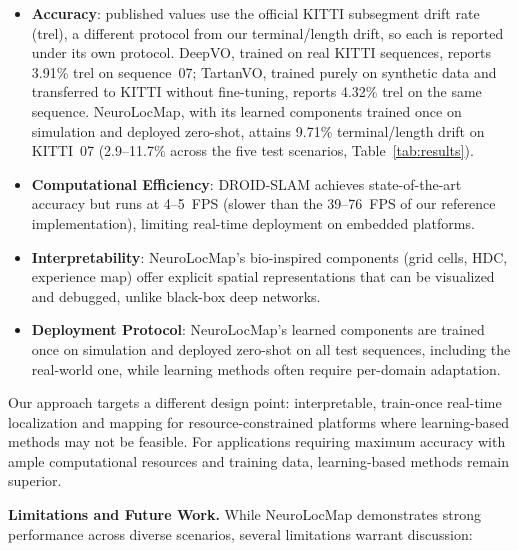 \begin{itemize}
    \item \textbf{Accuracy}: published values use the official KITTI subsegment drift rate (trel), a different protocol from our terminal/length drift, so each is reported under its own protocol. DeepVO, trained on real KITTI sequences, reports 3.91\% trel on sequence~07; TartanVO, trained purely on synthetic data and transferred to KITTI without fine-tuning, reports 4.32\% trel on the same sequence. NeuroLocMap, with its learned components trained once on simulation and deployed zero-shot, attains 9.71\% terminal/length drift on KITTI~07 (2.9--11.7\% across the five test scenarios, Table~\ref{tab:results}).

    \item \textbf{Computational Efficiency}: DROID-SLAM achieves state-of-the-art accuracy but runs at 4--5~FPS (slower than the 39--76~FPS of our reference implementation), limiting real-time deployment on embedded platforms.

    \item \textbf{Interpretability}: NeuroLocMap's bio-inspired components (grid cells, HDC, experience map) offer explicit spatial representations that can be visualized and debugged, unlike black-box deep networks.

    \item \textbf{Deployment Protocol}: NeuroLocMap's learned components are trained once on simulation and deployed zero-shot on all test sequences, including the real-world one, while learning methods often require per-domain adaptation.
\end{itemize}

Our approach targets a different design point: interpretable, train-once real-time localization and mapping for resource-constrained platforms where learning-based methods may not be feasible. For applications requiring maximum accuracy with ample computational resources and training data, learning-based methods remain superior.

\textbf{Limitations and Future Work.} While NeuroLocMap demonstrates strong per\-for\-mance across diverse scenarios, several limitations warrant discussion:

